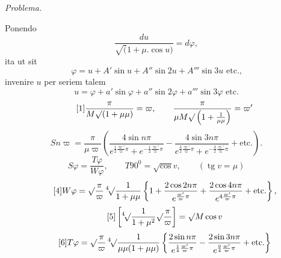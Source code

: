 \begingroup
\setlength{\headheight}{25pt}
\makeatletter\tagsleft@true\let\veqno\@@leqno\makeatother
{}\NoSourceHead
{}
\HistoricCitation{[Aus der Scheda Ac, Varia Novbr. 1799, S.\ 26ff.}
\noindent [S.\ 26]
\begin{center}\textit{Problema.}\end{center}
\par\indent Ponendo
\[\frac{du}{\surd(1+\mu.\cos u)}=d\varphi,\]
\noindent ita ut sit
\[\varphi=u+A'\sin u+A''\sin2u+A'''\sin3u\text{ etc.,}\]
\noindent invenire \(u\) per seriem talem
\[u=\varphi+a'\sin\varphi+a''\sin2\varphi+a'''\sin3\varphi\text{ etc.}\]
\ClosingRule
\begin{equation*}\tag*{[1]}
\frac{\pi}{M\surd(1+\mu\mu)}=\varpi,\qquad
\frac{\pi}{\mu M\surd\left(1+\frac1{\mu\mu}\right)}=\varpi'
\end{equation*}
\begin{equation*}\tag*{[2]}
Sn\varpi=\frac{\pi}{\mu\varpi}\left(
\frac{4\sin n\pi}{e^{\frac12\frac{\varpi'}\varpi\pi}+e^{-\frac12\frac{\varpi'}\varpi\pi}}
-\frac{4\sin3n\pi}{e^{\frac32\frac{\varpi'}\varpi\pi}+e^{-\frac32\frac{\varpi'}\varpi\pi}}+\text{etc.}\right).
\end{equation*}
\noindent [S.\ 26]
\begin{equation*}\tag*{[3]}
S\varphi=\frac{T\varphi}{W\varphi},\qquad T90^0=\surd\cos v,\qquad(\operatorname{tg}v=\mu)
\end{equation*}
\clearpage
{}
\begin{equation*}\tag*{[4]}
W\varphi=\surd\frac\pi\varpi\,{}^4\!\surd\frac1{1+\mu\mu}
\left\{1+\frac{2\cos2n\pi}{e^{\frac{\varpi'}\varpi\pi}}+\frac{2\cos4n\pi}{e^{4\frac{\varpi'}\varpi\pi}}+\text{etc.}\right\},
\end{equation*}
\begin{equation*}\tag*{[5]}
\left[{}^4\!\surd\frac1{1+\mu^2}\surd\frac\pi\varpi\right]=\surd M\cos v
\end{equation*}
\begin{equation*}\tag*{[6]}
T\varphi=\surd\frac\pi\varpi\,{}^4\!\surd\frac1{\mu\mu(1+\mu\mu)}
\left\{\frac{2\sin n\pi}{e^{\frac14\frac{\varpi'}\varpi\pi}}-\frac{2\sin3n\pi}{e^{\frac94\frac{\varpi'}\varpi\pi}}+\text{etc.}\right\}
\end{equation*}
